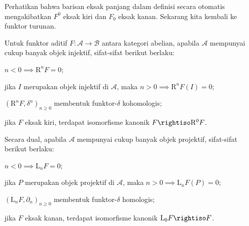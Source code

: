 Perhatikan bahwa barisan eksak panjang dalam definisi secara otomatis mengakibatkan $F^0$ eksak kiri dan $F_0$ eksak kanan. Sekarang kita kembali ke funktor turunan.

\begin{proposisi}\label{prop:derived-primer-long}
	Untuk funktor aditif $F: \mathcal{A} \to \mathcal{B}$ antara kategori abelian, apabila $\mathcal{A}$ mempunyai cukup banyak objek injektif, sifat-sifat berikut berlaku:
	\begin{compactitem}
		\item $n < 0 \implies \mathrm{R}^n F = 0$;
		\item jika $I$ merupakan objek injektif di $\mathcal{A}$, maka $n > 0 \implies \mathrm{R}^n F(I) = 0$;
		\item $(\mathrm{R}^n F, \delta^n)_{n \geq 0}$ membentuk funktor-$\delta$ kohomologis;
		\item jika $F$ eksak kiri, terdapat isomorfisme kanonik $F \rightiso \mathrm{R}^0 F$.
	\end{compactitem}

	Secara dual, apabila $\mathcal{A}$ mempunyai cukup banyak objek projektif, sifat-sifat berikut berlaku:
	\begin{compactitem}
		\item $n < 0 \implies \mathrm{L}_n F = 0$;
		\item jika $P$ merupakan objek projektif di $\mathcal{A}$, maka $n > 0 \implies \mathrm{L}_n F(P) = 0$;
		\item $(\mathrm{L}_n F, \partial_n)_{n \geq 0}$ membentuk funktor-$\delta$ homologis;
		\item jika $F$ eksak kanan, terdapat isomorfisme kanonik $\mathrm{L}_0 F \rightiso F$.
	\end{compactitem}
\end{proposisi}

